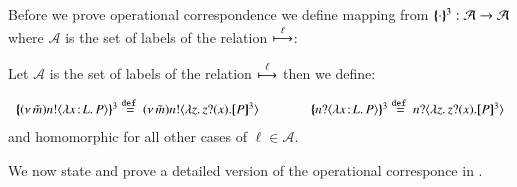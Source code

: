 
Before we prove operational correspondence we
define mapping from $\{\!\!\{\cdot\}\!\!\}^{3}: \mathcal{A} \to \mathcal{A}$
where $\mathcal{A}$ is the set of labels of the relation
$\stackrel{\ell}{\longmapsto}$:
\begin{definition}\rm
	Let $\mathcal{A}$ is the set of labels of the relation
	$\stackrel{\ell}{\longmapsto}$ then we define:

\[
	\begin{array}{c} 
		\mapa{\news{\tilde{m}} \bactout{n}{\abs{\AT{x}{L}}{P}}}^{3} 
		\defeq
		\news{\tilde{m}} \bactout{n}{\abs{z}{\binp{z}{x} \pmap{P}{3}}}
		\qquad \qquad
		\mapa{\bactinp{n}{\abs{\AT{x}{L}}{P}}}^{3}
		\defeq \bactinp{n}{\abs{z}{\binp{z}{x} \pmap{P}{3}}}
	\end{array}
\]
	and homomorphic for all other cases of $\ell \in \mathcal{A}$.
\end{definition}

We now state and prove a detailed version of the operational corresponce
in .

